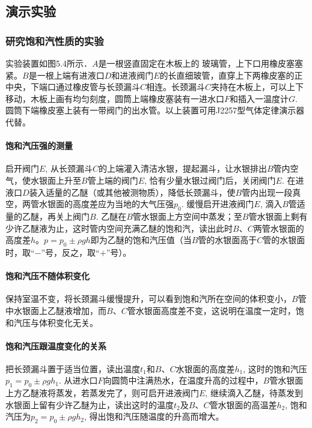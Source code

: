 \subsection{演示实验}
\subsubsection{研究饱和汽性质的实验}

实验装置如图5.4所示．$A$是一根竖直固定在木板上的
玻璃管，上下口用橡皮塞塞紧。$B$是一根上端有进液口$D$和进液阀门$E$的长直细玻管，直穿上下两橡皮塞的正中央，下端口通过橡皮管与长颈漏斗$C$相连。长颈漏斗$C$夹持在木板上，可以上下移动，木板上画有均匀刻度，圆筒上端橡皮塞装有一进水口$F$和插入一温度计$G$. 圆筒下端橡皮塞上装有一带阀门的出水管。以上装置可用J2257型气体定律演示器代替。
\begin{figure}[htp]
    \centering
    \caption{}
\end{figure}

\paragraph{饱和汽压强的测量}
启开阀门$E$, 从长颈漏斗$C$的上端灌入清洁水银，提起漏斗，让水银排出$B$管内空气，使水银面上升至$B$管上端的阀门$E$, 恰有少量水银过阀门后，关闭阀门$E$. 在进液口$D$装入适量的乙醚（或其他被测物质），降低长颈漏斗，使$B$管内出现一段真空，两管水银面的高度差应为当地的大气压强$p_0$. 缓慢启开进液阀门$E$, 滴入$B$管适量的乙醚，再关上阀门$B$. 乙醚在$B$管水银面上方空间中蒸发；至$B$管水银面上剩有少许乙醚液为止，这时管内空间充满乙醚的饱和汽，读出此时$B$、$C$两管水银面的高度差$h$。$p=p_0\pm \rho gh$即为乙醚的饱和汽压值（当$B$管的水银面高于$C$管的水银面时，取“$-$”号，反之，取“$+$”号）。

\paragraph{饱和汽压不随体积变化}
保持室温不变，将长颈漏斗缓慢提升，可以看到饱和汽所在空间的体积变小，$B$管中水银面上乙醚液增加，而$B$、$C$管水银面高度差不变，这说明在温度一定时，饱和汽压与体积变化无关。

\paragraph{饱和汽压跟温度变化的关系}
把长颈漏斗置于适当位置，读出温度$t_1$和$B$、$C$水银面的高度差$h_1$, 这时的饱和汽压$p_1=p_0\pm\rho gh_1$. 从进水口$F$向圆筒中注满热水，在温度升高的过程中，$B$管水银面上方乙醚液将蒸发，若蒸发完了，则可启开进液阀门$E$, 继续滴入乙醚，待蒸发到水银面上留有少许乙醚为止，读出这时的温度$t_2$及$B$、$C$管水银面的高温差$h_2$, 饱和汽压为$p_2=p_0\pm \rho gh_2$, 得出饱和汽压随温度的升高而增大。


